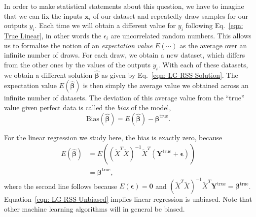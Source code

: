 In order to make statistical statements about this question, we have to imagine that we can fix the inputs $\bm{x}_{i}$ of our dataset  and repeatedly draw samples for our outputs $y_i$. Each time we will obtain a different value for $y_i$ following Eq.~\eqref{eqn: True Linear}, in other words the $\epsilon_i$ are uncorrelated random numbers.
This allows us to formalise the notion of an \emph{expectation value} $E(\cdots)$ as the average over an infinite number of draws. 
For each draw, we obtain a new dataset, which differs from the other ones by the values of the outputs $y_i$. With each of these datasets, we obtain a different solution $\hat{\bm{\beta}}$ as given by Eq.~\eqref{eqn: LG RSS Solution}. The expectation value $E(\hat{\bm{\beta}})$ is then simply the average value we obtained across an infinite number of datasets. The deviation of this average value from the ``true'' value given perfect data is called the \emph{bias} of the model,
\begin{equation}\label{eqn: Bias}
    \textrm{Bias}(\hat{\bm{\beta}}) = E(\hat{\bm{\beta}})-\bm{\beta}^{\textrm{true}}.
\end{equation}

For the linear regression we study here, the bias is exactly zero, because
\begin{equation}\label{eqn: LG RSS Unbiased}
    \begin{split}
      E(\hat{\bm{\beta}}) &= E\left((\widetilde{X}^{T}\widetilde{X})^{-1} \widetilde{X}^{T} (\bm{Y}^{\textrm{true}}+\bm{\epsilon})\right)\\
      &=\bm{\beta}^{\textrm{true}},
    \end{split}
\end{equation}
where the second line follows because $E(\bm{\epsilon}) = \bm{0}$ and $(\widetilde{X}^{T}\widetilde{X})^{-1} \widetilde{X}^{T} \bm{Y}^{\textrm{true}} = \bm{\beta}^{\textrm{true}}$. Equation~\eqref{eqn: LG RSS Unbiased} implies linear regression is unbiased. Note that other machine learning algorithms will in general be biased.

